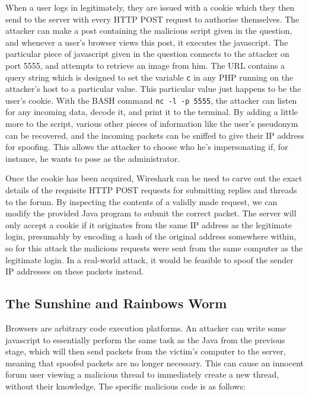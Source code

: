 When a user logs in legitimately, they are issued with a cookie which they then send to the server with every HTTP POST
request to authorise themselves. The attacker can make a post containing the malicious script given in the question, and
whenever a user's browser views this post, it executes the javascript. The particular piece of javascript given in the
question connects to the attacker on port 5555, and attempts to retrieve an image from him. The URL contains a query
string which is designed to set the variable {\tt c} in any PHP running on the attacker's host to a particular value.
This particular value just happens to be the user's cookie. With the BASH command {\tt nc -l -p 5555}, the attacker can
listen for any incoming data, decode it, and print it to the terminal. By adding a little more to the script, various
other pieces of information like the user's pseudonym can be recovered, and the incoming packets can be sniffed to give
their IP address for spoofing. This allows the attacker to choose who he's impersonating if, for instance, he wants to
pose as the administrator.

Once the cookie has been acquired, Wireshark can be used to carve out the exact details of the requisite HTTP POST
requests for submitting replies and threads to the forum. By inspecting the contents of a validly made request, we can
modify the provided Java program to submit the correct packet. The server will only accept a cookie if it originates
from the same IP address as the legitimate login, presumably by encoding a hash of the original address somewhere
within, so for this attack the malicious requests were sent from the same computer as the legitimate login. In a
real-world attack, it would be feasible to spoof the sender IP addresses on these packets instead.



\subsection{The Sunshine and Rainbows Worm}

Browsers are arbitrary code execution platforms. An attacker can write some javascript to essentially perform the same
task as the Java from the previous stage, which will then send packets from the victim's computer to the server, meaning
that spoofed packets are no longer necessary. This can cause an innocent forum user viewing a malicious thread to
immediately create a new thread, without their knowledge. The specific malicious code is as follows:

